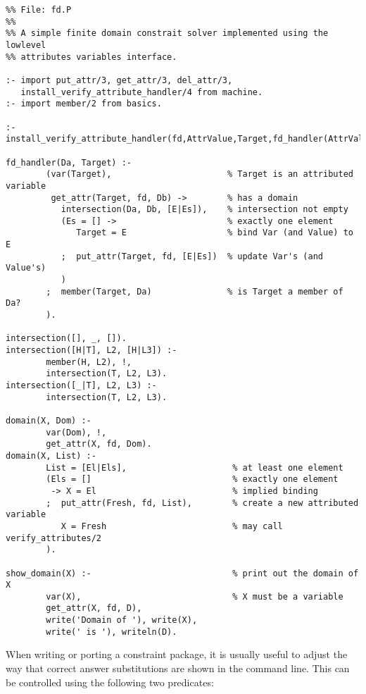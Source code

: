 \begin{small}
\begin{verbatim}
%% File: fd.P
%%
%% A simple finite domain constrait solver implemented using the lowlevel 
%% attributes variables interface.  

:- import put_attr/3, get_attr/3, del_attr/3, 
   install_verify_attribute_handler/4 from machine.
:- import member/2 from basics.

:- install_verify_attribute_handler(fd,AttrValue,Target,fd_handler(AttrValue,Target)).

fd_handler(Da, Target) :-
        (var(Target),                       % Target is an attributed variable
         get_attr(Target, fd, Db) ->        % has a domain
           intersection(Da, Db, [E|Es]),    % intersection not empty
           (Es = [] ->                      % exactly one element
              Target = E                    % bind Var (and Value) to E
           ;  put_attr(Target, fd, [E|Es])  % update Var's (and Value's)
           )
        ;  member(Target, Da)               % is Target a member of Da?
        ).

intersection([], _, []).
intersection([H|T], L2, [H|L3]) :-
        member(H, L2), !,
        intersection(T, L2, L3).
intersection([_|T], L2, L3) :-
        intersection(T, L2, L3).

domain(X, Dom) :- 
        var(Dom), !, 
        get_attr(X, fd, Dom). 
domain(X, List) :- 
        List = [El|Els],                     % at least one element 
        (Els = []                            % exactly one element
         -> X = El                           % implied binding 
        ;  put_attr(Fresh, fd, List),        % create a new attributed variable
           X = Fresh                         % may call verify_attributes/2
        ).

show_domain(X) :-                            % print out the domain of X
        var(X),                              % X must be a variable
        get_attr(X, fd, D),
        write('Domain of '), write(X),
        write(' is '), writeln(D).

\end{verbatim}
\end{small}

When writing or porting a constraint package, it is usually useful to
adjust the way that correct answer substitutions are shown in the
command line.  This can be controlled using the following two predicates:

